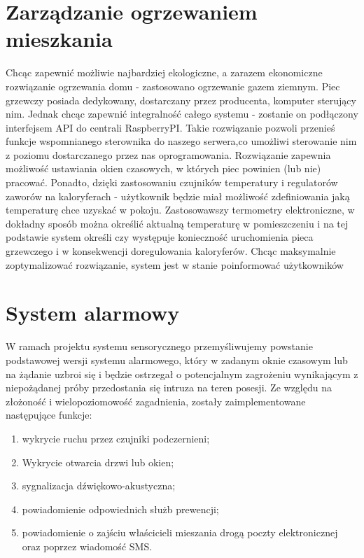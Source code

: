 \documentclass[12pt]{article} %
\begin{document}
\section{Zarządzanie ogrzewaniem mieszkania}
Chcąc zapewnić możliwie najbardziej ekologiczne, a zarazem ekonomiczne rozwiązanie ogrzewania domu - zastosowano ogrzewanie gazem ziemnym. Piec grzewczy posiada dedykowany, dostarczany przez producenta, komputer sterujący nim. Jednak chcąc zapewnić integralność całego systemu - zostanie on podłączony interfejsem API do centrali RaspberryPI. Takie rozwiązanie pozwoli przenieś funkcje wspomnianego sterownika do naszego serwera,co umożliwi sterowanie nim z poziomu dostarczanego przez nas oprogramowania. Rozwiązanie zapewnia możliwość ustawiania okien czasowych, w których piec powinien (lub nie) pracować. Ponadto, dzięki zastosowaniu czujników temperatury i regulatorów zaworów na kaloryferach - użytkownik będzie miał możliwość zdefiniowania jaką temperaturę chce uzyskać w pokoju. Zastosowawszy termometry elektroniczne, w dokładny sposób  można określić aktualną temperaturę w pomieszczeniu i na tej podstawie system określi czy występuje konieczność uruchomienia pieca grzewczego i w konsekwencji doregulowania kaloryferów. Chcąc maksymalnie zoptymalizować rozwiązanie, system jest w stanie poinformować użytkowników


\section{System alarmowy}
W ramach projektu systemu sensorycznego przemyśliwujemy powstanie podstawowej wersji systemu alarmowego, który w zadanym oknie czasowym lub na żądanie uzbroi się i będzie ostrzegał o potencjalnym zagrożeniu wynikającym z niepożądanej próby przedostania się intruza na teren posesji. Ze względu na złożoność i wielopoziomowość zagadnienia, zostały zaimplementowane następujące funkcje:
\begin{enumerate}
\item 
wykrycie ruchu przez czujniki podczernieni;
\item 
Wykrycie otwarcia drzwi lub okien;
\item 
sygnalizacja dźwiękowo-akustyczna;
\item 
powiadomienie odpowiednich służb prewencji;
\item 
powiadomienie o zajściu właścicieli mieszania drogą poczty elektronicznej oraz poprzez wiadomość SMS.
\end{enumerate}
\end{document}
